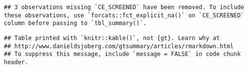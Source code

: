 \documentclass[
]{article}
\newenvironment{Shaded}{\begin{snugshade}}{\end{snugshade}}
\newcommand{\AttributeTok}[1]{\textcolor[rgb]{0.77,0.63,0.00}{#1}}
\newcommand{\FunctionTok}[1]{\textcolor[rgb]{0.00,0.00,0.00}{#1}}
\newcommand{\NormalTok}[1]{#1}
\newcommand{\OtherTok}[1]{\textcolor[rgb]{0.56,0.35,0.01}{#1}}
\newcommand{\SpecialCharTok}[1]{\textcolor[rgb]{0.00,0.00,0.00}{#1}}
\newcommand{\StringTok}[1]{\textcolor[rgb]{0.31,0.60,0.02}{#1}}
\begin{document}
\begin{Shaded}
\end{Shaded}

\begin{verbatim}
## 3 observations missing `CE_SCREENED` have been removed. To include these observations, use `forcats::fct_explicit_na()` on `CE_SCREENED` column before passing to `tbl_summary()`.
\end{verbatim}

\begin{verbatim}
## Table printed with `knitr::kable()`, not {gt}. Learn why at
## http://www.danieldsjoberg.com/gtsummary/articles/rmarkdown.html
## To suppress this message, include `message = FALSE` in code chunk header.
\end{verbatim}
\end{document}
